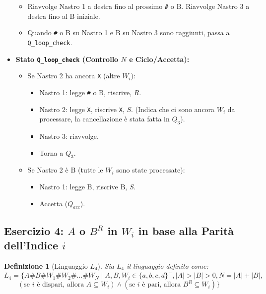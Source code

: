 \documentclass[a4paper, 11pt]{book} %
\newtheorem{definition}[theorem]{Definizione}
\theoremstyle{definition}
\newcommand{\B}{\text{B}} %
\begin{document}
\begin{itemize}
\begin{itemize}
            \item Riavvolge Nastro 1 a destra fino al prossimo \texttt{\#} o $\B$. Riavvolge Nastro 3 a destra fino al $\B$ iniziale.
            \item Quando \texttt{\#} o $\B$ su Nastro 1 e $\B$ su Nastro 3 sono raggiunti, passa a \texttt{Q\_{loop\_check}}.
        \end{itemize}
    \item \textbf{Stato \texttt{Q\_{loop\_check}} (Controllo $N$ e Ciclo/Accetta):}
        \begin{itemize}
            \item Se Nastro 2 ha ancora \texttt{X} (altre $W_i$):
                \begin{itemize}
                    \item Nastro 1: legge \texttt{\#} o $\B$, riscrive, $R$.
                    \item Nastro 2: legge \texttt{X}, riscrive \texttt{X}, $S$. (Indica che ci sono ancora $W_i$ da processare, la cancellazione è stata fatta in $Q_3$).
                    \item Nastro 3: riavvolge.
                    \item Torna a $Q_3$.
                \end{itemize}
            \item Se Nastro 2 è $\B$ (tutte le $W_i$ sono state processate):
                \begin{itemize}
                    \item Nastro 1: legge $\B$, riscrive $\B$, $S$.
                    \item Accetta ($Q_{acc}$).
                \end{itemize}
        \end{itemize}
\end{itemize}

\subsection{Esercizio 4: $A$ o $B^R$ in $W_i$ in base alla Parità dell'Indice $i$}

\begin{definition}[Linguaggio $L_4$]
Sia $L_4$ il linguaggio definito come:
$L_4 = \{A\texttt{\#}B\texttt{\#}W_1 \texttt{\#} W_2 \texttt{\#} \dots \texttt{\#} W_N \mid A, B, W_i \in \{a,b,c,d\}^+, |A| > |B| > 0, N = |A| + |B|, $
$\qquad (\text{se } i \text{ è dispari, allora } A \subseteq W_i) \land (\text{se } i \text{ è pari, allora } B^R \subseteq W_i) \}$
\end{definition}
\end{document}
